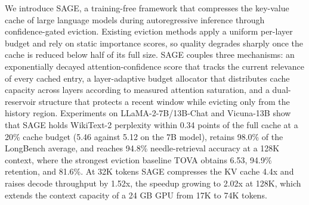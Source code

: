 We introduce SAGE, a training-free framework that compresses the
key-value cache of large language models during autoregressive inference
through confidence-gated eviction. Existing eviction methods apply a
uniform per-layer budget and rely on static importance scores, so
quality degrades sharply once the cache is reduced below half of its
full size. SAGE couples three mechanisms: an exponentially decayed
attention-confidence score that tracks the current relevance of every
cached entry, a layer-adaptive budget allocator that distributes cache
capacity across layers according to measured attention saturation, and
a dual-reservoir structure that protects a recent window while evicting
only from the history region. Experiments on LLaMA-2-7B/13B-Chat and Vicuna-13B show
that SAGE holds WikiText-2 perplexity within 0.34 points of the full
cache at a 20\% cache budget (5.46 against 5.12 on the 7B model),
retains 98.0\% of the LongBench average, and reaches 94.8\%
needle-retrieval accuracy at a 128K context, where the strongest
eviction baseline TOVA obtains 6.53, 94.9\% retention, and 81.6\%.
At 32K tokens SAGE compresses the KV cache 4.4x and raises decode
throughput by 1.52x, the speedup growing to 2.02x at 128K, which
extends the context capacity of a 24 GB GPU from 17K to 74K tokens.
